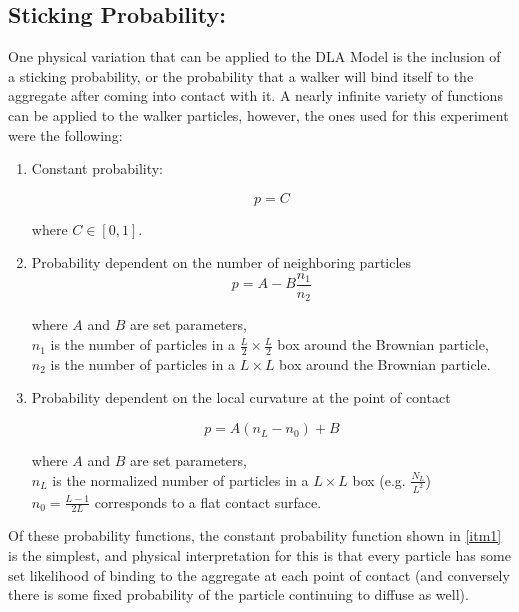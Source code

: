 \documentclass{article}
\begin{document}
\subsection{Sticking Probability:}

One physical variation that can be applied to the DLA Model is the inclusion of a sticking probability, or the probability that a walker will bind itself to the aggregate after coming into contact with it. A nearly infinite variety of functions can be applied to the walker particles, however, the ones used for this experiment were the following: \\

\begin{enumerate} 
	\item{Constant probability:

\begin{equation}
	p = C
\label{p:coeff}
\end{equation}

	where $C \in [0,1]$.
	\label{itm1}} \pagebreak
	\item {Probability dependent on the number of neighboring particles\\
	
\begin{equation}
	p = A - B\frac{n_1}{n_2}
\label{p:neighbor}
\end{equation}

	where $A$ and $B$ are set parameters,\\ $n_1$ is the number of particles in a $\frac{L}{2} \times \frac{L}{2}$ box around the Brownian particle,\\ $n_2$ is the number of particles in a $L \times L$ box around the Brownian particle.
	\label{itm2}}
	\item{Probability dependent on the local curvature at the point of contact \cite{vic} 
	
\begin{equation}
	p = A(n_L - n_0) + B
\label{p:curvature}
\end{equation}
	
	where $A$ and $B$ are set parameters,\\
	$n_L$ is the normalized number of particles in a $L \times L$ box (e.g. $\frac{N_L}{L^2}$)\\
	$n_0 = \frac{L-1}{2L}$ corresponds to a flat contact surface.
	\label{itm3}} 
	\end{enumerate}

\noindent Of these probability functions, the constant probability function shown in \ref{itm1} is the simplest, and physical interpretation for this is that every particle has some set likelihood of binding to the aggregate at each point of contact (and conversely there is some fixed probability of the particle continuing to diffuse as well). 
\end{document}
